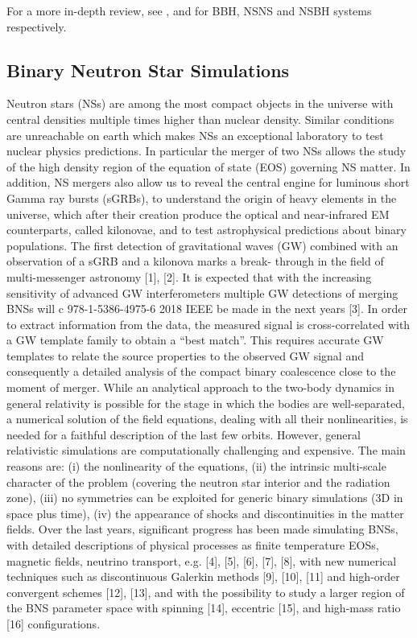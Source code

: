 \documentclass{ut-thesis}
\begin{document}
For a more in-depth review, see \cite{sperhake2014numerical}, \cite{faber2012binary} and \cite{shibata2011coalescence} for BBH, NSNS and NSBH systems respectively.

\subsection{Binary Neutron Star Simulations}

Neutron stars (NSs) are among the most compact objects in
the universe with central densities multiple times higher than
nuclear density. Similar conditions are unreachable on earth
which makes NSs an exceptional laboratory to test nuclear
physics predictions. In particular the merger of two NSs
allows the study of the high density region of the equation
of state (EOS) governing NS matter. In addition, NS mergers
also allow us to reveal the central engine for luminous short
Gamma ray bursts (sGRBs), to understand the origin of
heavy elements in the universe, which after their creation
produce the optical and near-infrared EM counterparts, called
kilonovae, and to test astrophysical predictions about binary
populations.
The first detection of gravitational waves (GW) combined
with an observation of a sGRB and a kilonova marks a break-
through in the field of multi-messenger astronomy [1], [2]. It is
expected that with the increasing sensitivity of advanced GW
interferometers multiple GW detections of merging BNSs will
c
978-1-5386-4975-6 
2018
IEEE
be made in the next years [3]. In order to extract information
from the data, the measured signal is cross-correlated with a
GW template family to obtain a “best match”. This requires
accurate GW templates to relate the source properties to the
observed GW signal and consequently a detailed analysis of
the compact binary coalescence close to the moment of merger.
While an analytical approach to the two-body dynamics
in general relativity is possible for the stage in which the
bodies are well-separated, a numerical solution of the field
equations, dealing with all their nonlinearities, is needed for
a faithful description of the last few orbits. However, general
relativistic simulations are computationally challenging and
expensive. The main reasons are: (i) the nonlinearity of
the equations, (ii) the intrinsic multi-scale character of the
problem (covering the neutron star interior and the radiation
zone), (iii) no symmetries can be exploited for generic binary
simulations (3D in space plus time), (iv) the appearance
of shocks and discontinuities in the matter fields. Over the
last years, significant progress has been made simulating
BNSs, with detailed descriptions of physical processes as
finite temperature EOSs, magnetic fields, neutrino transport,
e.g. [4], [5], [6], [7], [8], with new numerical techniques
such as discontinuous Galerkin methods [9], [10], [11] and
high-order convergent schemes [12], [13], and with the
possibility to study a larger region of the BNS parameter
space with spinning [14], eccentric [15], and high-mass
ratio [16] configurations.
\end{document}
